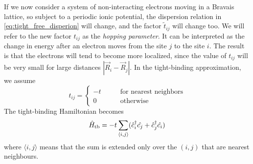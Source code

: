 If we now consider a system of non-interacting electrons moving in a Bravais lattice, so subject to a periodic ionic potential, the dispersion relation in \cref{eq:tight_free_disperion} will change, and the factor $\tilde{t}_{ij}$ will change too. We will refer to the new factor $t_{ij}$ as the \emph{hopping parameter}. It can be interpreted as the change in energy after an electron moves from the site $j$ to the site $i$. The result is that the electrons will tend to become more localized, since the value of $t_{ij}$ will be very small for large distances $|\vec{R}_i - \vec{R}_j|$. In the tight-binding approximation, we assume
\begin{equation}
    t_{ij} =
    \begin{cases}
        -t \qquad                                     & \text{for nearest neighbors} \\
        0                                      \qquad & \text{otherwise}
    \end{cases}
\end{equation}
The tight-binding Hamiltonian becomes
\begin{equation} \label{eq:tight_hamiltonian_position}
    \hat{H}_\text{tb} = -t \sum_{\langle i,j \rangle} (\hat{c}^\dagger_i\hat{c_j} +  \hat{c}^\dagger_j\hat{c_i})
\end{equation}
where ${\langle i,j \rangle}$ means that the sum is extended only over the $(i,j)$ that are nearest neighbours.

